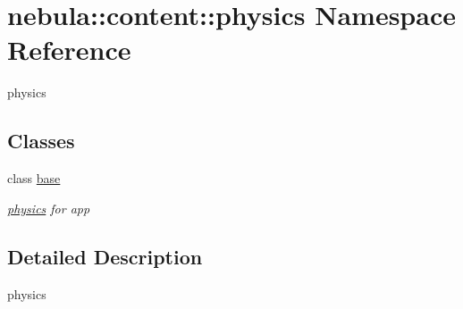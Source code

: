 \hypertarget{namespacenebula_1_1content_1_1physics}{
\section{nebula::content::physics Namespace Reference}
\label{namespacenebula_1_1content_1_1physics}
}


physics  
\subsection*{Classes}
\begin{DoxyCompactItemize}
\item 
class \hyperlink{classnebula_1_1content_1_1physics_1_1base}{base}
\begin{DoxyCompactList}\small\item\em \hyperlink{namespacenebula_1_1content_1_1physics}{physics} for app \item\end{DoxyCompactList}\end{DoxyCompactItemize}


\subsection{Detailed Description}
physics 
